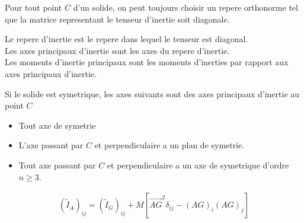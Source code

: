 \documentclass[../main.tex]{subfiles}
\begin{document}
Pour tout point $C$ d'un solide, on peut toujours choisir un repere orthonorme tel que la matrice representant le tenseur d'inertie soit diagonale.

\begin{defn}
Le repere d'inertie est le repere dans lequel le tenseur est diagonal.\\
Les axes principaux d'inertie sont les axes du repere d'inertie.\\
Les moments d'inertie principaux sont les moments d'inerties par rapport aux axes principaux d'inertie.
\end{defn}
Si le solide est symetrique, les axes suivants sont des axes principaux d'inertie au point $C$ 
\begin{itemize}
\item Tout axe de symetrie
\item L'axe passant par $C$ et perpendiculaire a un plan de symetrie.
\item Tout axe passant par $C$ et perpendiculaire a un axe de symetrique d'ordre $n\geq 3$.
\end{itemize}
\begin{thm}
	\begin{align*}
		( \tilde{I}_A )_{ij} = ( \tilde{I}_G)_{ij} + M \left[ \vec{AG}^{2} \delta_{ij}  - ( AG) _i( AG)_j  \right] 
	\end{align*}
	

\end{thm}
\end{document}
